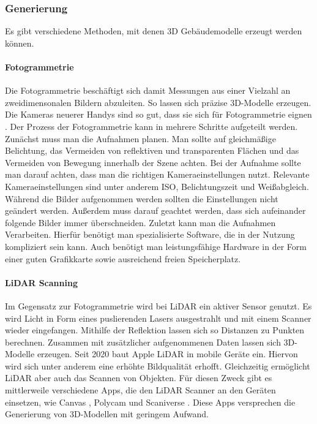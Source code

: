 \subsubsection{Generierung}
Es gibt verschiedene Methoden, mit denen 3D Gebäudemodelle erzeugt werden können.

\paragraph{Fotogrammetrie}

Die Fotogrammetrie beschäftigt sich damit Messungen aus einer Vielzahl an zweidimensonalen Bildern abzuleiten. So lassen sich präzise 3D-Modelle erzeugen.\cite[S.~19]{Aber2010} Die Kameras neuerer Handys sind so gut, dass sie sich für Fotogrammetrie eignen \cite{Cohrs2021}. Der Prozess der Fotogrammetrie kann in mehrere Schritte aufgeteilt werden. Zunächst muss man die Aufnahmen planen. Man sollte auf gleichmäßige Belichtung, das Vermeiden von reflektiven und transparenten Flächen und das Vermeiden von Bewegung innerhalb der Szene achten. Bei der Aufnahme sollte man darauf achten, dass man die richtigen Kameraeinstellungen nutzt. Relevante Kameraeinstellungen sind unter anderem ISO, Belichtungszeit und Weißabgleich. Während die Bilder aufgenommen werden sollten die Einstellungen nicht geändert werden. Außerdem muss darauf geachtet werden, dass sich aufeinander folgende Bilder immer überschneiden.\cite{Cohrs2021b} Zuletzt kann man die Aufnahmen Verarbeiten. Hierfür benötigt man spezialisierte Software, die in der Nutzung kompliziert sein kann. Auch benötigt man leistungsfähige Hardware in der Form einer guten Grafikkarte sowie ausreichend freien Speicherplatz.\cite{Cohrs2021c}

\paragraph{LiDAR Scanning}
Im Gegensatz zur Fotogrammetrie wird bei \ac{LiDAR} ein aktiver Sensor genutzt. Es wird Licht in Form eines puslierenden Lasers ausgestrahlt und mit einem Scanner wieder eingefangen. Mithilfe der Reflektion lassen sich so Distanzen zu Punkten berechnen. Zusammen mit zusätzlicher aufgenommenen Daten lassen sich 3D-Modelle erzeugen. Seit 2020 baut Apple \ac{LiDAR} in mobile Geräte ein. Hiervon wird sich unter anderem eine erhöhte Bildqualität erhofft. Gleichzeitig ermöglicht \ac{LiDAR} aber auch das Scannen von Objekten.\cite{Fenstermaker2022} Für diesen Zweck gibt es mittlerweile verschiedene Apps, die den \ac{LiDAR} Scanner an den Geräten einsetzen, wie Canvas \cite{Canvas2023}, Polycam \cite{Polycam2024} und Scaniverse \cite{Scaniverse2024}. Diese Apps versprechen die Generierung von 3D-Modellen mit geringem Aufwand.

